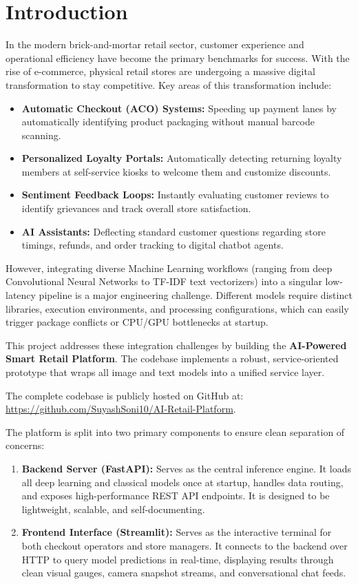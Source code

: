 \documentclass[12pt,a4paper]{article}
\begin{document}
\newpage
{}

\tableofcontents
\newpage

\section{Introduction}
In the modern brick-and-mortar retail sector, customer experience and operational efficiency have become the primary benchmarks for success. With the rise of e-commerce, physical retail stores are undergoing a massive digital transformation to stay competitive. Key areas of this transformation include:
\begin{itemize}
    \item \textbf{Automatic Checkout (ACO) Systems:} Speeding up payment lanes by automatically identifying product packaging without manual barcode scanning.
    \item \textbf{Personalized Loyalty Portals:} Automatically detecting returning loyalty members at self-service kiosks to welcome them and customize discounts.
    \item \textbf{Sentiment Feedback Loops:} Instantly evaluating customer reviews to identify grievances and track overall store satisfaction.
    \item \textbf{AI Assistants:} Deflecting standard customer questions regarding store timings, refunds, and order tracking to digital chatbot agents.
\end{itemize}

However, integrating diverse Machine Learning workflows (ranging from deep Convolutional Neural Networks to TF-IDF text vectorizers) into a singular low-latency pipeline is a major engineering challenge. Different models require distinct libraries, execution environments, and processing configurations, which can easily trigger package conflicts or CPU/GPU bottlenecks at startup.

This project addresses these integration challenges by building the \textbf{AI-Powered Smart Retail Platform}. The codebase implements a robust, service-oriented prototype that wraps all image and text models into a unified service layer. 

The complete codebase is publicly hosted on GitHub at: \\
\url{https://github.com/SuyashSoni10/AI-Retail-Platform}.

The platform is split into two primary components to ensure clean separation of concerns:
\begin{enumerate}
    \item \textbf{Backend Server (FastAPI):} Serves as the central inference engine. It loads all deep learning and classical models once at startup, handles data routing, and exposes high-performance REST API endpoints. It is designed to be lightweight, scalable, and self-documenting.
    \item \textbf{Frontend Interface (Streamlit):} Serves as the interactive terminal for both checkout operators and store managers. It connects to the backend over HTTP to query model predictions in real-time, displaying results through clean visual gauges, camera snapshot streams, and conversational chat feeds.
\end{enumerate}
\end{document}
